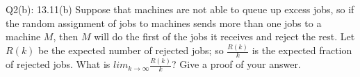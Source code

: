 \begin{problem}
  {Q2(b): 13.11(b)}
  Suppose that machines are not able to queue up excess jobs, so if the random assignment of jobs to machines sends more than one jobs to a machine
  $M$, then $M$ will do the first of the jobs it receives and reject the rest. Let $R(k)$ be the expected number of rejected jobs; so $\frac{R(k)}{k}$
  is the expected fraction of rejected jobs. What is $lim_{k \rightarrow \infty}\frac{R(k)}{k}$? Give a proof of your answer.
\end{problem}
